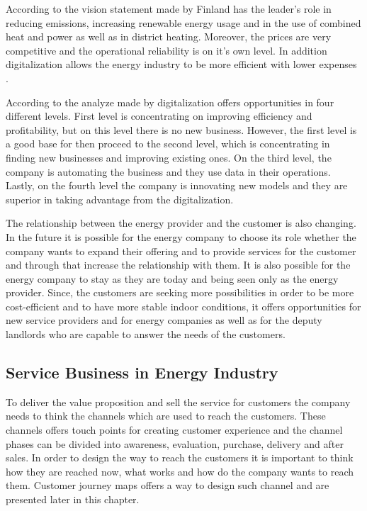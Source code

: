 According to the vision statement made by \textcite{Energiateollisuus:2018} Finland has the leader's role in reducing emissions, increasing renewable energy usage and in the use of combined heat and power as well as in district heating. Moreover, the prices are very competitive and the operational reliability is on it's own level. In addition digitalization allows the energy industry to be more efficient with lower expenses \parencite{Tekes:2017}.

According to the analyze made by \textcite{Deloitte} digitalization offers opportunities in four different levels. First level is concentrating on improving efficiency and profitability, but on this level there is no new business. However, the first level is a good base for then proceed to the second level, which is concentrating in finding new businesses and improving existing ones. On the third level, the company is automating the business and they use data in their operations. Lastly, on the fourth level the company is innovating new models and they are superior in taking advantage from the digitalization.

The relationship between the energy provider and the customer is also changing. In the future it is possible for the energy company to choose its role whether the company wants to expand their offering and to provide services for the customer and through that increase the relationship with them. It is also possible for the energy company to stay as they are today and being seen only as the energy provider. Since, the customers are seeking more possibilities in order to be more cost-efficient and to have more stable indoor conditions, it offers opportunities for new service providers and for energy companies as well as for the deputy landlords who are capable to answer the needs of the customers. \parencite{Deloitte}

\subsection{Service Business in Energy Industry}

To deliver the value proposition and sell the service for customers the company needs to think the channels which are used to reach the customers. These channels offers touch points for creating customer experience and the channel phases can be divided into awareness, evaluation, purchase, delivery and after sales. In order to design the way to reach the customers it is important to think how they are reached now, what works and how do the company wants to reach them. \parencite{BusinessModelGeneration:2010} Customer journey maps offers a way to design such channel and are presented later in this chapter.

